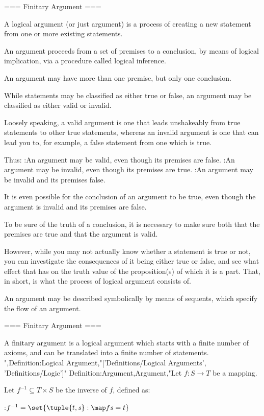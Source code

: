 === Finitary Argument ===

A logical argument (or just argument) is a process of creating a new statement from one or more existing statements.

An argument proceeds from a set of premises to a conclusion, by means of logical implication, via a procedure called logical inference.


An argument may have more than one premise, but only one conclusion.


While statements may be classified as either true or false, an argument may be classified as either valid or invalid.


Loosely speaking, a valid argument is one that leads unshakeably from true statements to other true statements, whereas an invalid argument is one that can lead you to, for example, a false statement from one which is true.


Thus:
:An argument may be valid, even though its premises are false.
:An argument may be invalid, even though its premises are true.
:An argument may be invalid and its premises false.

It is even possible for the conclusion of an argument to be true, even though the argument is invalid and its premises are false.


To be sure of the truth of a conclusion, it is necessary to make sure both that the premises are true and that the argument is valid.


However, while you may not actually know whether a statement is true or not, you can investigate the consequences of it being either true or false, and see what effect that has on the truth value of the proposition(s) of which it is a part. That, in short, is what the process of logical argument consists of.


An argument may be described symbolically by means of sequents, which specify the flow of an argument.


=== Finitary Argument ===

A finitary argument is a logical argument which starts with a finite number of axioms, and can be translated into a finite number of statements.
",Definition:Logical Argument,"['Definitions/Logical Arguments', 'Definitions/Logic']"
Definition:Argument,Argument,"Let $f: S \to T$ be a mapping.

Let $f^{-1} \subseteq T \times S$ be the inverse of $f$, defined as:

:$f^{-1} = \set {\tuple {t, s}: \map f s = t}$


